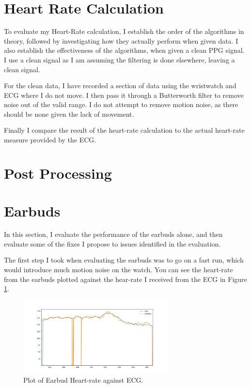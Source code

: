 \documentclass[12pt,a4paper,twoside,openright]{report}
\begin{document}
\section{Heart Rate Calculation}

To evaluate my Heart-Rate calculation, I establish the order of the algorithms
in theory, followed by investigating how they actually perform when given
data. I also establish the effectiveness of the algorithms, when given a clean
PPG signal. I use a clean signal as I am assuming the filtering is done
elsewhere, leaving a clean signal.

For the clean data, I have recorded a section of data using the wristwatch and ECG
where I do not move. I then pass it through a Butterworth filter to remove
noise out of the valid range. I do not attempt to remove motion noise, as
there should be none given the lack of movement.

Finally I compare the result of the heart-rate calculation to the actual
heart-rate measure provided by the ECG.

\section{Post Processing}

\section{Earbuds}

In this section, I evaluate the performance of the earbuds alone, and then
evaluate some of the fixes I propose to issues identified in the evaluation.

The first step I took when evaluating the earbuds was to go on a fast run,
which would introduce much motion noise on the watch. You can see the
heart-rate from the earbuds plotted against the hear-rate I received from the
ECG in Figure \ref{fig:earbud-fast}.

\begin{figure}[tbh]
	\centerline{\includegraphics[width=0.7\textwidth]{figs/earbud-fast-graph.png}}
	\caption{Plot of Earbud Heart-rate against ECG.}
	\label{fig:earbud-fast}
\end{figure}
\end{document}
